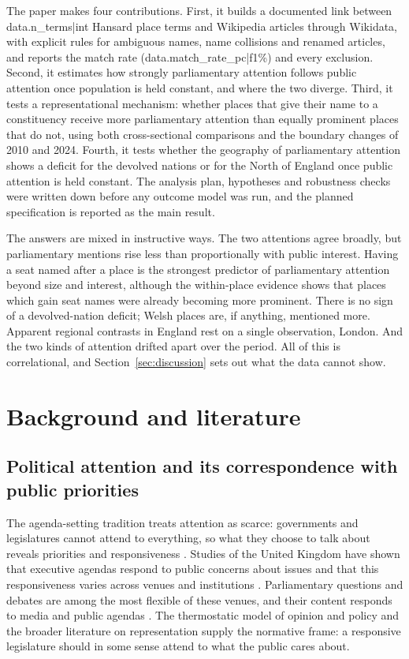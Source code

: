 \documentclass[11pt,a4paper]{article}
\begin{document}
The paper makes four contributions. First, it builds a documented link between {{data.n_terms|int}} Hansard place terms and Wikipedia articles through Wikidata, with explicit rules for ambiguous names, name collisions and renamed articles, and reports the match rate ({{data.match_rate_pc|f1}}\%) and every exclusion. Second, it estimates how strongly parliamentary attention follows public attention once population is held constant, and where the two diverge. Third, it tests a representational mechanism: whether places that give their name to a constituency receive more parliamentary attention than equally prominent places that do not, using both cross-sectional comparisons and the boundary changes of 2010 and 2024. Fourth, it tests whether the geography of parliamentary attention shows a deficit for the devolved nations or for the North of England once public attention is held constant. The analysis plan, hypotheses and robustness checks were written down before any outcome model was run, and the planned specification is reported as the main result.

The answers are mixed in instructive ways. The two attentions agree broadly, but parliamentary mentions rise less than proportionally with public interest. Having a seat named after a place is the strongest predictor of parliamentary attention beyond size and interest, although the within-place evidence shows that places which gain seat names were already becoming more prominent. There is no sign of a devolved-nation deficit; Welsh places are, if anything, mentioned more. Apparent regional contrasts in England rest on a single observation, London. And the two kinds of attention drifted apart over the period. All of this is correlational, and Section~\ref{sec:discussion} sets out what the data cannot show.

\section{Background and literature}
\subsection{Political attention and its correspondence with public priorities}
The agenda-setting tradition treats attention as scarce: governments and legislatures cannot attend to everything, so what they choose to talk about reveals priorities and responsiveness \citep{BaumgartnerJones1993,JonesBaumgartner2005}. Studies of the United Kingdom have shown that executive agendas respond to public concerns about issues \citep{JenningsJohn2009} and that this responsiveness varies across venues and institutions \citep{BevanJennings2014}. Parliamentary questions and debates are among the most flexible of these venues, and their content responds to media and public agendas \citep{VliegenthartWalgrave2011}. The thermostatic model of opinion and policy \citep{SorokaWlezien2010} and the broader literature on representation \citep{Pitkin1967,EulauKarps1977,Mansbridge2003} supply the normative frame: a responsive legislature should in some sense attend to what the public cares about.
\end{document}
